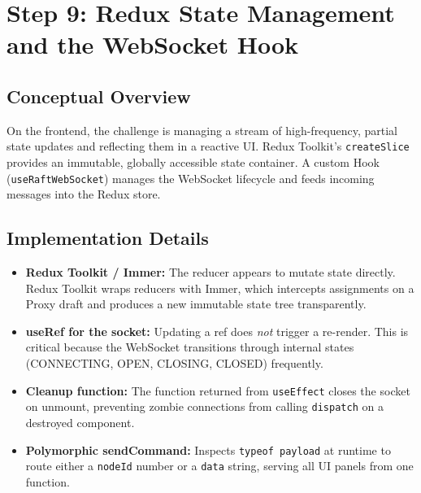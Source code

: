 \documentclass[11pt, a4paper]{article}
\begin{document}
\newpage

\section{Step 9: Redux State Management and the WebSocket Hook}

\subsection{Conceptual Overview}
On the frontend, the challenge is managing a stream of high-frequency,
partial state updates and reflecting them in a reactive UI. Redux Toolkit's
\texttt{createSlice} provides an immutable, globally accessible state
container. A custom Hook (\texttt{useRaftWebSocket}) manages the WebSocket
lifecycle and feeds incoming messages into the Redux store.

\subsection{Implementation Details}
\begin{itemize}[leftmargin=*]
    \item \textbf{Redux Toolkit / Immer:} The reducer appears to mutate
          state directly. Redux Toolkit wraps reducers with Immer, which
          intercepts assignments on a Proxy draft and produces a new
          immutable state tree transparently.
    \item \textbf{useRef for the socket:} Updating a ref does \textit{not}
          trigger a re-render. This is critical because the WebSocket
          transitions through internal states (CONNECTING, OPEN, CLOSING,
          CLOSED) frequently.
    \item \textbf{Cleanup function:} The function returned from
          \texttt{useEffect} closes the socket on unmount, preventing zombie
          connections from calling \texttt{dispatch} on a destroyed component.
    \item \textbf{Polymorphic sendCommand:} Inspects \texttt{typeof payload}
          at runtime to route either a \texttt{nodeId} number or a
          \texttt{data} string, serving all UI panels from one function.
\end{itemize}
\end{document}
